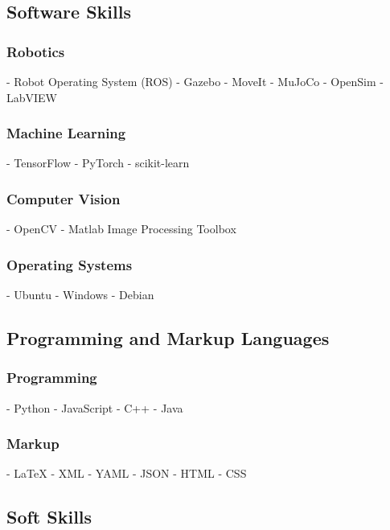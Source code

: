 \documentclass[a4paper]{article}
\begin{document}
\subsection{Software Skills}
        
\subsubsection{Robotics}
- Robot Operating System (ROS)
- Gazebo
- MoveIt
- MuJoCo
- OpenSim
- LabVIEW
    
\subsubsection{Machine Learning}
- TensorFlow
- PyTorch
- scikit-learn
    
\subsubsection{Computer Vision}
- OpenCV
- Matlab Image Processing Toolbox
    
\subsubsection{Operating Systems}
- Ubuntu
- Windows
- Debian
    
    
\subsection{Programming and Markup Languages}
        
\subsubsection{Programming}
- Python
- JavaScript
- C++
- Java
    
\subsubsection{Markup}
- {\LaTeX}
- XML
- YAML
- JSON
- HTML
- CSS
    
\subsection{Soft Skills}
        
\end{document}
